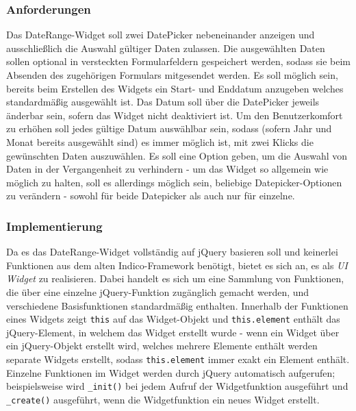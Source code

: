 \subsubsection{Anforderungen}

Das DateRange-Widget soll zwei DatePicker nebeneinander anzeigen und ausschließlich die Auswahl
gültiger Daten zulassen. Die ausgewählten Daten sollen optional in versteckten Formularfeldern
gespeichert werden, sodass sie beim Absenden des zugehörigen Formulars mitgesendet werden. Es soll
möglich sein, bereits beim Erstellen des Widgets ein Start- und Enddatum anzugeben welches
standardmäßig ausgewählt ist. Das Datum soll über die DatePicker jeweils änderbar sein, sofern das
Widget nicht deaktiviert ist. Um den Benutzerkomfort zu erhöhen soll jedes gültige Datum auswählbar
sein, sodass (sofern Jahr und Monat bereits ausgewählt sind) es immer möglich ist, mit zwei Klicks
die gewünschten Daten auszuwählen. Es soll eine Option geben, um die Auswahl von Daten in der
Vergangenheit zu verhindern - um das Widget so allgemein wie möglich zu halten, soll es allerdings
möglich sein, beliebige Datepicker-Optionen zu verändern - sowohl für beide Datepicker als auch nur
für einzelne.

\subsubsection{Implementierung}

Da es das DateRange-Widget vollständig auf jQuery basieren soll und keinerlei Funktionen aus dem
alten Indico-Framework benötigt, bietet es sich an, es als \emph{UI Widget} zu realisieren. Dabei
handelt es sich um eine Sammlung von Funktionen, die über eine einzelne jQuery-Funktion zugänglich
gemacht werden, und verschiedene Basisfunktionen standardmäßig enthalten. Innerhalb der Funktionen
eines Widgets zeigt \lstinline{this} auf das Widget-Objekt und \lstinline{this.element} enthält das
jQuery-Element, in welchem das Widget erstellt wurde - wenn ein Widget über ein jQuery-Objekt
erstellt wird, welches mehrere Elemente enthält werden separate Widgets erstellt, sodass
\lstinline{this.element} immer exakt ein Element enthält. Einzelne Funktionen im Widget werden durch
jQuery automatisch aufgerufen; beispielsweise wird \lstinline{_init()} bei jedem Aufruf der
Widgetfunktion ausgeführt und \lstinline{_create()} ausgeführt, wenn die Widgetfunktion ein neues
Widget erstellt.

